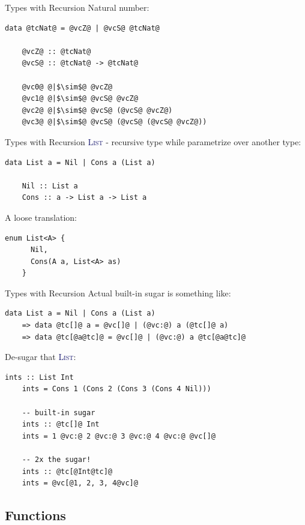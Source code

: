 \documentclass[xcolor={usenames,dvipsnames}]{beamer}
\newcommand{\htycon}[1]{\textcolor{MidnightBlue}{\textsc{#1}}}
\begin{document}
\begin{frame}[fragile]{Types with Recursion}
  Natural number:
  \begin{lstlisting}[style=hask]
    data @tcNat@ = @vcZ@ | @vcS@ @tcNat@

    @vcZ@ :: @tcNat@
    @vcS@ :: @tcNat@ -> @tcNat@

    @vc0@ @|$\sim$@ @vcZ@
    @vc1@ @|$\sim$@ @vcS@ @vcZ@
    @vc2@ @|$\sim$@ @vcS@ (@vcS@ @vcZ@)
    @vc3@ @|$\sim$@ @vcS@ (@vcS@ (@vcS@ @vcZ@))
  \end{lstlisting}
\end{frame}

\begin{frame}[fragile]{Types with Recursion}
  \htycon{List} - recursive type while parametrize over another type:
  \begin{lstlisting}[style=hask]
    data List a = Nil | Cons a (List a)

    Nil :: List a
    Cons :: a -> List a -> List a
  \end{lstlisting}

  \pause
  A loose translation:
  \begin{lstlisting}[style=hask]
    enum List<A> {
      Nil,
      Cons(A a, List<A> as)
    }
  \end{lstlisting}
\end{frame}

\begin{frame}[fragile]{Types with Recursion}
  Actual built-in sugar is something like:
  \begin{lstlisting}[style=hask]
       data List a = Nil | Cons a (List a)
    => data @tc[]@ a = @vc[]@ | (@vc:@) a (@tc[]@ a)
    => data @tc[@a@tc]@ = @vc[]@ | (@vc:@) a @tc[@a@tc]@
  \end{lstlisting}

  \pause
  De-sugar that \htycon{List}:
  \begin{lstlisting}[style=hask]
    ints :: List Int 
    ints = Cons 1 (Cons 2 (Cons 3 (Cons 4 Nil)))

    -- built-in sugar
    ints :: @tc[]@ Int
    ints = 1 @vc:@ 2 @vc:@ 3 @vc:@ 4 @vc:@ @vc[]@

    -- 2x the sugar!
    ints :: @tc[@Int@tc]@
    ints = @vc[@1, 2, 3, 4@vc]@
  \end{lstlisting}
\end{frame}


\subsection{Functions}
\end{document}
